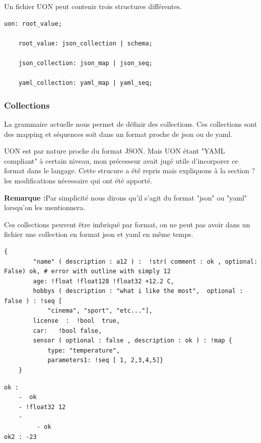 \documentclass[
    iict, %
    il, %
]{heig-tb}
\begin{document}
Un fichier UON peut contenir trois structures différentes.

\begin{lstlisting}[frame=single,caption={uon-root-value},label={uon-root-value}]
    uon: root_value;

    root_value: json_collection | schema;

    json_collection: json_map | json_seq;

    yaml_collection: yaml_map | yaml_seq;
\end{lstlisting}

\subsubsection{Collections}
La grammaire actuelle nous permet de définir des collections. Ces collections sont des mapping et séquences soit dans un format proche de json ou de yaml.

UON est par nature proche du format JSON. Mais UON étant "YAML compliant" à certain niveau, mon précesseur avait jugé utile d'incorporer ce format
dans le langage. Cette strucure a été repris mais expliquons à la section ? %
les modifications nécessaire qui ont été apporté.

\textbf{Remarque :}Par simplicité nous dirons qu'il s'agit du format "json" ou "yaml" lorsqu'on les mentionnera.

Ces collections peuvent être imbriqué par format, on ne peut pas avoir dans un fichier une collection en format json et yaml en même temps.


\begin{lstlisting}[frame=single,caption={json-map},label={json-map}]
    {
        "name" ( description : a12 ) :  !str( comment : ok , optional: False) ok, # error with outline with simply 12
        age: !float !float128 !float32 +12.2 C,
        hobbys ( description : "what i like the most",  optional : false ) : !seq [
            "cinema", "sport", "etc..."],
        license  :  !bool  true,
        car:   !bool false,
        sensor ( optional : false , description : ok ) : !map {
            type: "temperature",
            parameters1: !seq [ 1, 2,3,4,5]}
    }
\end{lstlisting}

\begin{lstlisting}[frame=single,caption={yaml-map},label={yaml-map}]
ok :
    -  ok
    - !float32 12
    -
         - ok
ok2 : -23
\end{lstlisting}
\end{document}
